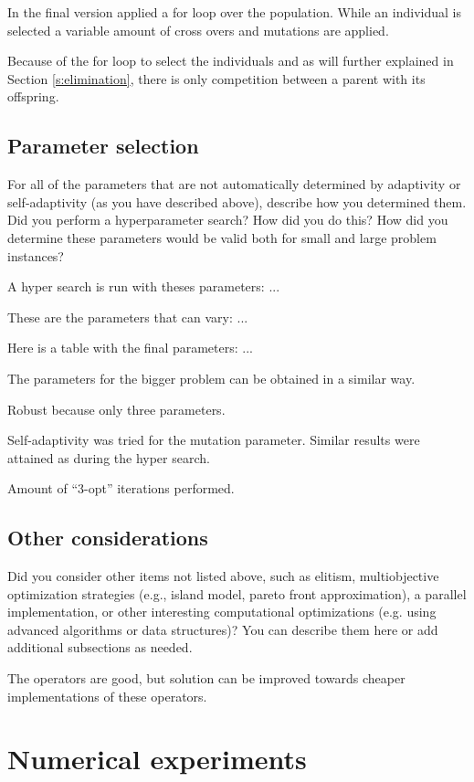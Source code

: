 \documentclass[a4paper,10pt]{article}
\newcommand{\ReplaceMe}[1]{{\color{blue}#1}}
\begin{document}
In the final version applied a for loop over the population. While an individual is selected a variable amount of cross overs and mutations are applied. 

Because of the for loop to select the individuals and as will further explained in Section \ref{s:elimination}, there is only competition between a parent with its offspring. 



\subsection{Parameter selection}

\ReplaceMe{For all of the parameters that are not automatically determined by adaptivity or self-adaptivity (as you have described above), describe how you determined them. Did you perform a hyperparameter search? How did you do this? How did you determine these parameters would be valid both for small and large problem instances?}

A hyper search is run with theses parameters: ...

These are the parameters that can vary: ...

Here is a table with the final parameters: ...

The parameters for the bigger problem can be obtained in a similar way. 

Robust because only three parameters.


Self-adaptivity was tried for the mutation parameter. Similar results were attained as during the hyper search. 

Amount of ``3-opt'' iterations performed. 


\subsection{Other considerations}

\ReplaceMe{Did you consider other items not listed above, such as elitism, multiobjective optimization strategies (e.g., island model, pareto front approximation), a parallel implementation, or other interesting computational optimizations (e.g. using advanced algorithms or data structures)? You can describe them here or add additional subsections as needed.}

 The operators are good, but solution can be improved towards cheaper implementations of these operators.


\section{Numerical experiments}
\end{document}
